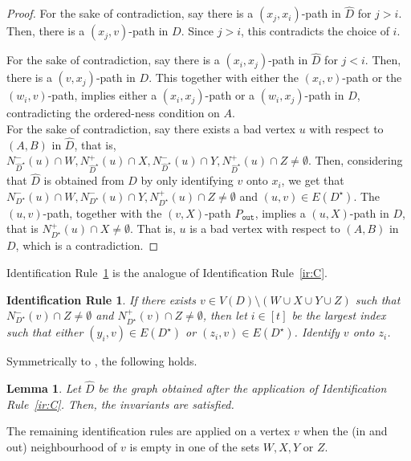\documentclass[a4paper,11pt]{article}
\newcommand{\out}{\texttt{out}}
\theoremstyle{plain}
\newtheorem{lemma}[theorem]{Lemma}
\newtheorem{identification rule}{Identification Rule}
\theoremstyle{definition}
\theoremstyle{remark}
\begin{document}
\begin{proof}
For the sake of contradiction, say there is a $(x_j,x_i)$-path in $\widehat{D}$ for $j >i$. Then, there is a $(x_j,v)$-path in $D$. Since $j >i$, this contradicts the choice of $i$.

For the sake of contradiction, say there is a $(x_i,x_j)$-path in $\widehat{D}$ for $j <i$. Then, there is a $(v,x_j)$-path in $D$. This together with either the $(x_i,v)$-path or the $(w_i,v)$-path, implies either a $(x_i,x_j)$-path or a $(w_i,x_j)$-path in $D$, contradicting the ordered-ness condition on $A$.\\


 For the sake of contradiction, say there exists a bad vertex $u$ with respect to $(A,B)$ in $\widehat{D}$, that is, $N_{\widehat{D}^{\star}}^-(u) \cap W, N_{\widehat{D}^{\star}}^+(u) \cap X, N_{\widehat{D}^{\star}}^-(u) \cap Y, N_{\widehat{D}^{\star}}^+(u) \cap Z \neq \emptyset$. 
Then, considering that $\widehat{D}$ is obtained from $D$ by only identifying $v$ onto $x_i$, we get that
$N_{D^{\star}}^-(u) \cap W, N_{D^{\star}}^-(u) \cap Y, N_{D^{\star}}^+(u) \cap Z \neq \emptyset$ and $(u,v) \in E(D^{\star})$.  The $(u,v)$-path, together with the $(v,X)$-path $P_{\out}$, implies a $(u,X)$-path in $D$, that is $N_{D^{\star}}^+(u) \cap X \neq \emptyset$. That is, $u$ is a bad vertex with respect to $(A,B)$ in $D$, which is a contradiction.
\end{proof}

Identification Rule~\ref{ir:D} is the analogue of Identification Rule~\ref{ir:C}.

\begin{identification rule}\label{ir:D}
If there exists $v \in V(D) \setminus (W \cup X \cup Y \cup Z)$ such that $N_{D^{\star}}^-(v) \cap Z \neq \emptyset$ and  $N_{D^{\star}}^+(v) \cap Z \neq \emptyset$,
then let $i \in [t]$ be the largest index such that either $(y_i,v) \in E(D^{\star})$ or $(z_i,v) \in E(D^{\star})$. 
Identify $v$ onto $z_i$.
\end{identification rule}

Symmetrically to , the following holds.

\begin{lemma}\label{lem:irC-safe-symmetric}
Let $\widehat{D}$ be the graph obtained after the application of Identification Rule~\ref{ir:C}. Then, the invariants are satisfied.
\end{lemma}

The remaining identification rules are applied on a vertex $v$ when the (in and out) neighbourhood of $v$ is empty in one of the sets $W,X,Y$ or $Z$.
\end{document}
